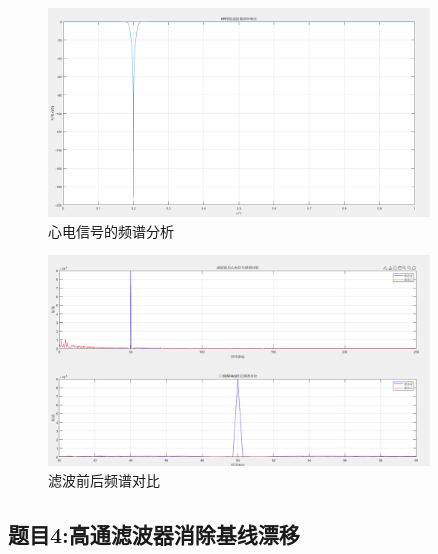 \documentclass[12pt,hyperref,a4paper,UTF8]{ctexart}
\begin{document}
\begin{figure}[H] %
        \centering
        \includegraphics[width=0.9\textwidth]{figures/3_3.png} %
        \caption{心电信号的频谱分析} %
        \label{fig:3_3} %
\end{figure}

\begin{figure}[H] %
        \centering
        \includegraphics[width=0.9\textwidth]{figures/3_4.png} %
        \caption{滤波前后频谱对比} %
        \label{fig:3_4} %
\end{figure}


\subsection{题目4:高通滤波器消除基线漂移}
\end{document}
